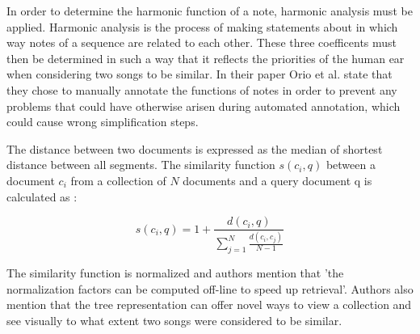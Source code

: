\documentclass{llncs}
\begin{document}
\begin{itemize}
		In order to determine the harmonic function of a note, harmonic analysis must be applied. Harmonic analysis is the process of making statements about in which way notes of a sequence are related to each other.
		These three coefficents must then be determined in such a way that it reflects the priorities of the human ear when considering two songs to be similar. 
		In their paper Orio et al. state that they chose to manually annotate the functions of notes in order to prevent any problems that could have otherwise arisen during automated annotation, which could cause wrong simplification steps. 

		The distance between two documents is expressed as the median of shortest distance between all segments. The similarity function $s(c_i, q)$ between a document $c_i$ from a collection of $N$ documents and a query document q is calculated as :
		
		\begin{equation}
			s(c_i, q)= 1 + \frac{d(c_i, q)}{\sum_{j=1}^{N} \frac{d(c_i,c_j)}{N-1}} 
		\end{equation}

		The similarity function is normalized and authors mention that 'the normalization factors can be computed off-line to speed up retrieval'. Authors also mention that the tree representation can offer novel ways to view a collection and see visually to what extent two songs were considered to be similar.



\end{itemize}
\end{document}
